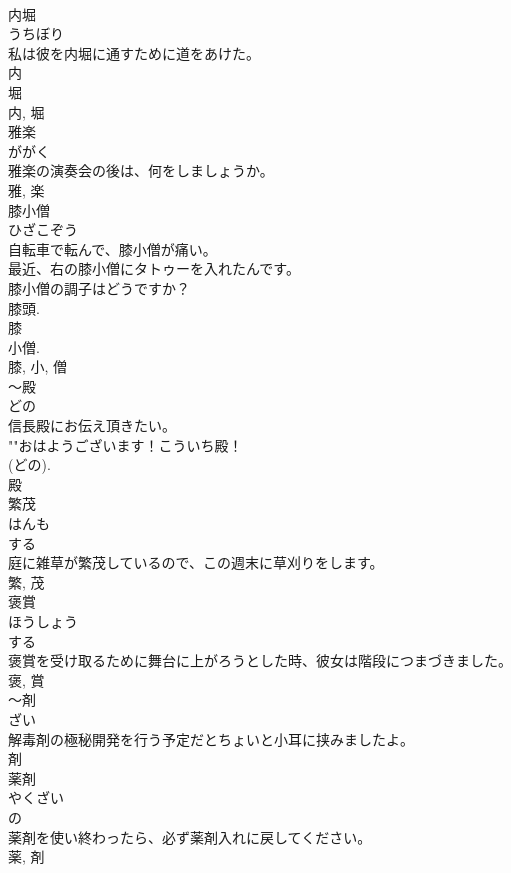 \documentclass[8pt]{extreport}
\begin{document}
\begin{CJK}{UTF8}{min}
\\	内堀	
\\	うちぼり	
\\	私は彼を内堀に通すために道をあけた。	
\\	内 
\\	堀 
\\	内, 堀	
\\	雅楽	
\\	ががく	
\\	雅楽の演奏会の後は、何をしましょうか。	
\\	雅, 楽	
\\	膝小僧	
\\	ひざこぞう	
\\	自転車で転んで、膝小僧が痛い。	
\\	最近、右の膝小僧にタトゥーを入れたんです。	
\\	膝小僧の調子はどうですか？	
\\	膝頭. 
\\	膝 
\\	小僧. 
\\	膝, 小, 僧	
\\	〜殿	
\\	どの	
\\	信長殿にお伝え頂きたい。	
\\	""おはようございます！こういち殿！
\\	(どの). 
\\	殿	
\\	繁茂	
\\	はんも	
\\	する 
\\	庭に雑草が繁茂しているので、この週末に草刈りをします。	
\\	繁, 茂	
\\	褒賞	
\\	ほうしょう	
\\	する 
\\	褒賞を受け取るために舞台に上がろうとした時、彼女は階段につまづきました。	
\\	褒, 賞	
\\	〜剤	
\\	ざい	
\\	解毒剤の極秘開発を行う予定だとちょいと小耳に挟みましたよ。	
\\	剤	
\\	薬剤	
\\	やくざい	
\\	の 
\\	薬剤を使い終わったら、必ず薬剤入れに戻してください。	
\\	薬, 剤	

\end{CJK}
\end{document}
